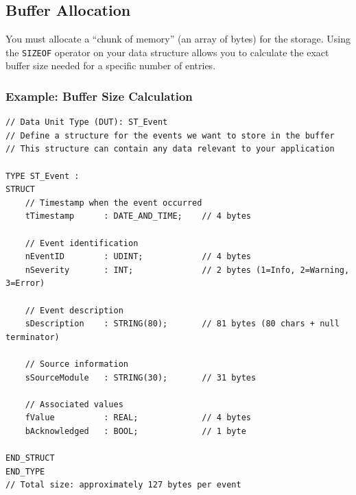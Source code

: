 \documentclass[11pt,a4paper]{article}
\begin{document}
\subsection{Buffer Allocation}

You must allocate a ``chunk of memory'' (an array of bytes) for the storage. Using the \texttt{SIZEOF} operator on your data structure allows you to calculate the exact buffer size needed for a specific number of entries.

\subsubsection*{Example: Buffer Size Calculation}

\begin{lstlisting}
// Data Unit Type (DUT): ST_Event
// Define a structure for the events we want to store in the buffer
// This structure can contain any data relevant to your application

TYPE ST_Event :
STRUCT
    // Timestamp when the event occurred
    tTimestamp      : DATE_AND_TIME;    // 4 bytes
    
    // Event identification
    nEventID        : UDINT;            // 4 bytes
    nSeverity       : INT;              // 2 bytes (1=Info, 2=Warning, 3=Error)
    
    // Event description
    sDescription    : STRING(80);       // 81 bytes (80 chars + null terminator)
    
    // Source information
    sSourceModule   : STRING(30);       // 31 bytes
    
    // Associated values
    fValue          : REAL;             // 4 bytes
    bAcknowledged   : BOOL;             // 1 byte
    
END_STRUCT
END_TYPE
// Total size: approximately 127 bytes per event
\end{lstlisting}
\end{document}
